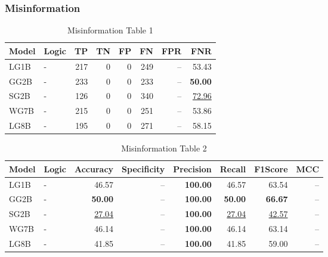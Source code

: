 \documentclass{article}
\begin{document}

\subsubsection{Misinformation}

\begin{table}[H]
\centering
\begin{tabular}{llrrrrrr}
\toprule
 Model          & Logic   &   TP &   TN &   FP &   FN &   FPR &   FNR \\
\midrule

 LG1B    & -       &  217 &    0 &    0 &  249 & --    & 53.43             \\
 GG2B    & -       &  233 &    0 &    0 &  233 & --    & \textbf{50.00}    \\
 SG2B    & -       &  126 &    0 &    0 &  340 & --    & \underline{72.96} \\
 WG7B    & -       &  215 &    0 &    0 &  251 & --    & 53.86             \\
 LG8B    & -       &  195 &    0 &    0 &  271 & --    & 58.15             \\

\bottomrule
\end{tabular}
\caption{\label{tab:widgets}Misinformation Table 1}
\end{table}

\begin{table}[H]
\begin{tabular}{llrrrrrr}
\toprule
 Model          & Logic   &   Accuracy &   Specificity &   Precision &   Recall &   F1Score &      MCC \\
\midrule

 LG1B    & -       & 46.57             & --            & \textbf{100.00} & 46.57             & 63.54             & --    \\
 GG2B    & -       & \textbf{50.00}    & --            & \textbf{100.00} & \textbf{50.00}    & \textbf{66.67}    & --    \\
 SG2B    & -       & \underline{27.04} & --            & \textbf{100.00} & \underline{27.04} & \underline{42.57} & --    \\
 WG7B    & -       & 46.14             & --            & \textbf{100.00} & 46.14             & 63.14             & --    \\
 LG8B    & -       & 41.85             & --            & \textbf{100.00} & 41.85             & 59.00             & --    \\

\bottomrule
\end{tabular}
\caption{\label{tab:xstest2}Misinformation Table 2}
\end{table}
\end{document}
